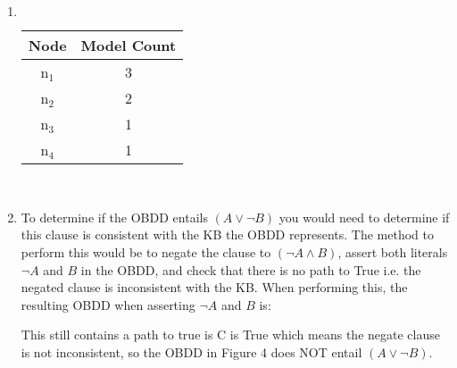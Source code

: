 \documentclass{article}
\begin{document}
\section{}
\begin{enumerate}
    \item \[\]
    \begin{center}
           \begin{tabular}{ |c|c| }
                \hline
                 Node&Model Count \\ 
                 \hline
                n$_1$&3 \\
                n$_2$&2 \\
                n$_3$&1 \\
                n$_4$&1 \\
                 \hline
                \end{tabular} \\
    \end{center}
    \item To determine if the OBDD entails $(A \lor \lnot B)$ you would need to determine if this clause is consistent with the KB the OBDD represents.  The method to perform this would be to negate the clause to $(\lnot A \land B)$, assert both literals $\lnot A$ and $B$ in the OBDD, and check that there is no path to True i.e. the negated clause is inconsistent with the KB.  When performing this, the resulting OBDD when asserting $\lnot A$ and $B$ is:
    \begin{center}
    \end{center}
    This still contains a path to true is C is True which means the negate clause is not inconsistent, so the OBDD in Figure 4 does NOT entail $(A \lor \lnot B)$.
\end{enumerate}

\clearpage
\end{document}

